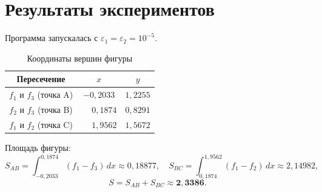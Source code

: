 \documentclass[a4paper,12pt,titlepage,finall]{article}
\begin{document}
\newpage

\section{Результаты экспериментов}

Программа запускалась с $\varepsilon_1 = \varepsilon_2 = 10^{-5}$.

\begin{table}[h]
\centering
\begin{tabular}{|c|c|c|}
\hline
Пересечение & $x$ & $y$ \\
\hline
$f_1$ и $f_3$ (точка A) & $-0{,}2033$ & $1{,}2255$ \\
$f_2$ и $f_3$ (точка B) & $\phantom{-}0{,}1874$ & $0{,}8291$ \\
$f_1$ и $f_2$ (точка C) & $\phantom{-}1{,}9562$ & $1{,}5672$ \\
\hline
\end{tabular}
\caption{Координаты вершин фигуры}
\label{table1}
\end{table}

Площадь фигуры:
\[
    S_{AB} = \int_{-0{,}2033}^{0{,}1874} (f_1 - f_3)\,dx \approx 0{,}18877, \quad
    S_{BC} = \int_{0{,}1874}^{1{,}9562} (f_1 - f_2)\,dx \approx 2{,}14982,
\]
\[
    S = S_{AB} + S_{BC} \approx \mathbf{2{,}3386}.
\]
\end{document}

